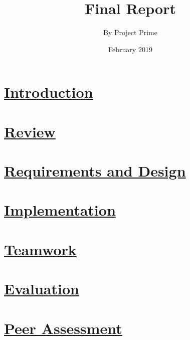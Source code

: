 \documentclass{article}
\title{Final Report}
\author{By Project Prime}
\date{February 2019}
\begin{document}
   \maketitle
 	\section{\underline{Introduction}}

	\section{\underline{Review}}

	\section{\underline{Requirements and Design}}

	\section{\underline{Implementation}}
	
	\section{\underline{Teamwork}}

	\section{\underline{Evaluation}}

	\section{\underline{Peer Assessment}}
\end{document}
